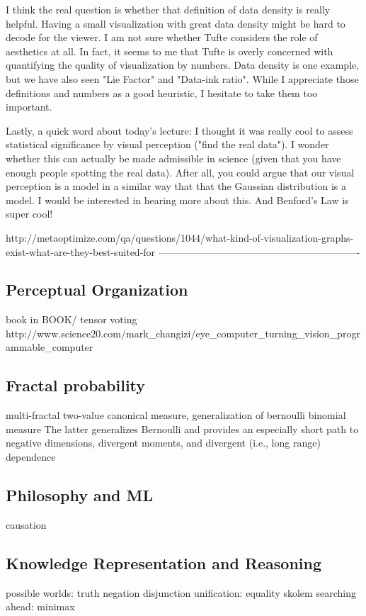 \documentclass[12pt]{article}
\begin{document}
I think the real question is whether that definition of data density is really helpful. Having a small visualization with great data density might be hard to decode for the viewer. I am not sure whether Tufte considers the role of aesthetics at all. In fact, it seems to me that Tufte is overly concerned with quantifying the quality of visualization by numbers. Data density is one example, but we have also seen "Lie Factor" and "Data-ink ratio". While I appreciate those definitions and numbers as a good heuristic, I hesitate to take them too important.

Lastly, a quick word about today's lecture: I thought it was really cool to assess statistical significance by visual perception ("find the real data"). I wonder whether this can actually be made admissible in science (given that you have enough people spotting the real data). After all, you could argue that our visual perception is a model in a similar way that that the Gaussian distribution is a model. I would be interested in hearing more about this. And Benford's Law is super cool!

http://metaoptimize.com/qa/questions/1044/what-kind-of-visualization-graphs-exist-what-are-they-best-suited-for
-------------------------------------------------------------
\subsection*{Perceptual Organization}
book in BOOK/ tensor voting
http://www.science20.com/mark_changizi/eye_computer_turning_vision_programmable_computer



\subsection*{Fractal probability}
multi-fractal
two-value canonical measure, generalization of bernoulli binomial measure
The latter generalizes Bernoulli and
provides an especially short path to negative dimensions, divergent moments, and divergent
(i.e., long range) dependence

\subsection*{Philosophy and ML}
causation


\subsection*{Knowledge Representation and Reasoning}
possible worlds: truth negation disjunction
unification: equality skolem
searching ahead: minimax
\end{document}
